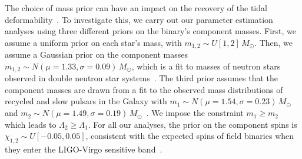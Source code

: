 The choice of mass prior can have an impact on the recovery of the tidal deformability~\cite{Agathos:2015uaa}. To investigate this, we carry out our parameter estimation analyses using three different priors on the binary's component masses. First, we assume a uniform prior on each star's mass, with $m_{1,2} \sim U[1,2]\, M_\odot$. Then, we assume a Gaussian prior on the component masses $m_{1,2} \sim N(\mu = 1.33, \sigma = 0.09)\, M_\odot$, which is a fit to masses of neutron stars observed in  double neutron star systems~\cite{Ozel:2016oaf}. The third prior assumes that the component masses are drawn from a fit to the observed mass distributions of recycled and slow pulsars in the Galaxy with $m_1 \sim N(\mu = 1.54, \sigma = 0.23)\, M_\odot$ and $m_2 \sim N(\mu = 1.49, \sigma = 0.19)\, M_\odot$~\cite{Ozel:2016oaf}. We impose the constraint $m_1 \geq m_2$ which leads to $\Lambda_2 \geq \Lambda_1$. For all our analyses, the prior on the component spins is $\chi_{1,2} \sim U[-0.05,0.05]$, consistent with the expected spins of field binaries when they enter the LIGO-Virgo sensitive band~\cite{Brown:2012qf}.

